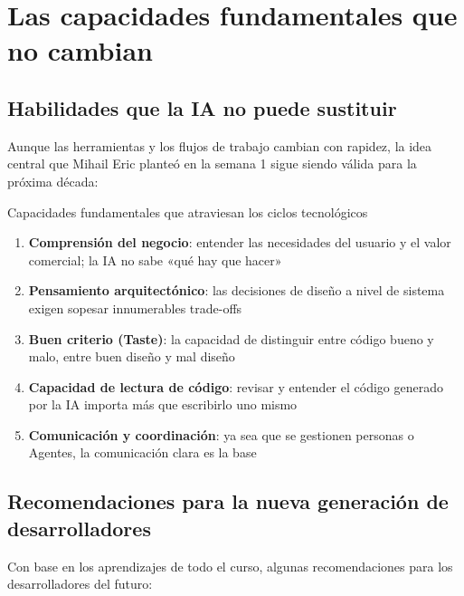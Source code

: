 \section{Las capacidades fundamentales que no cambian}

\subsection{Habilidades que la IA no puede sustituir}

Aunque las herramientas y los flujos de trabajo cambian con rapidez, la idea central que Mihail Eric planteó en la semana 1 sigue siendo válida para la próxima década:

\begin{importantbox}{Capacidades fundamentales que atraviesan los ciclos tecnológicos}
\begin{enumerate}
    \item \textbf{Comprensión del negocio}: entender las necesidades del usuario y el valor comercial; la IA no sabe «qué hay que hacer»
    \item \textbf{Pensamiento arquitectónico}: las decisiones de diseño a nivel de sistema exigen sopesar innumerables trade-offs
    \item \textbf{Buen criterio (Taste)}: la capacidad de distinguir entre código bueno y malo, entre buen diseño y mal diseño
    \item \textbf{Capacidad de lectura de código}: revisar y entender el código generado por la IA importa más que escribirlo uno mismo
    \item \textbf{Comunicación y coordinación}: ya sea que se gestionen personas o Agentes, la comunicación clara es la base
\end{enumerate}
\end{importantbox}

\subsection{Recomendaciones para la nueva generación de desarrolladores}

Con base en los aprendizajes de todo el curso, algunas recomendaciones para los desarrolladores del futuro:

